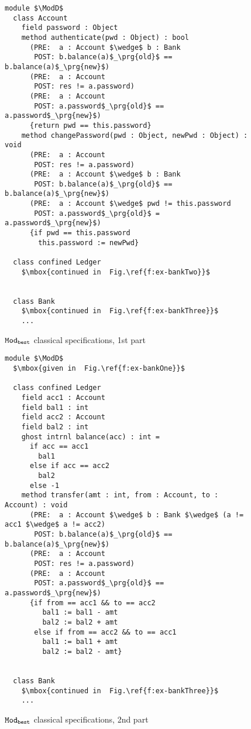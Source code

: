 \begin{figure}[htb]
\begin{lstlisting}[mathescape=true, frame=lines]
module $\ModD$
  class Account
    field password : Object
    method authenticate(pwd : Object) : bool
      (PRE:  a : Account $\wedge$ b : Bank
       POST: b.balance(a)$_\prg{old}$ == b.balance(a)$_\prg{new}$)
      (PRE:  a : Account
       POST: res != a.password)
      (PRE:  a : Account
       POST: a.password$_\prg{old}$ == a.password$_\prg{new}$)
      {return pwd == this.password}
    method changePassword(pwd : Object, newPwd : Object) : void
      (PRE:  a : Account
       POST: res != a.password)
      (PRE:  a : Account $\wedge$ b : Bank
       POST: b.balance(a)$_\prg{old}$ == b.balance(a)$_\prg{new}$)
      (PRE:  a : Account $\wedge$ pwd != this.password
       POST: a.password$_\prg{old}$ = a.password$_\prg{new}$)
      {if pwd == this.password
        this.password := newPwd}

  class confined Ledger
    $\mbox{continued in  Fig.\ref{f:ex-bankTwo}}$
      

  class Bank
    $\mbox{continued in  Fig.\ref{f:ex-bankThree}}$
    ...
\end{lstlisting}
\caption{${\texttt{Mod}}_{{\texttt{best}}}$ classical specifications, 1st part}
\label{f:ex-bankOne}
\end{figure}

\begin{figure}[htb]
\begin{lstlisting}[mathescape=true, frame=lines]
module $\ModD$
  $\mbox{given in  Fig.\ref{f:ex-bankOne}}$

  class confined Ledger
    field acc1 : Account
    field bal1 : int
    field acc2 : Account
    field bal2 : int
    ghost intrnl balance(acc) : int = 
      if acc == acc1
        bal1
      else if acc == acc2
        bal2
      else -1
    method transfer(amt : int, from : Account, to : Account) : void
      (PRE:  a : Account $\wedge$ b : Bank $\wedge$ (a != acc1 $\wedge$ a != acc2)
       POST: b.balance(a)$_\prg{old}$ == b.balance(a)$_\prg{new}$)
      (PRE:  a : Account
       POST: res != a.password)
      (PRE:  a : Account
       POST: a.password$_\prg{old}$ == a.password$_\prg{new}$)
      {if from == acc1 && to == acc2
         bal1 := bal1 - amt
         bal2 := bal2 + amt
       else if from == acc2 && to == acc1
         bal1 := bal1 + amt
         bal2 := bal2 - amt}
      

  class Bank
    $\mbox{continued in  Fig.\ref{f:ex-bankThree}}$
    ...
\end{lstlisting}
\caption{${\texttt{Mod}}_{{\texttt{best}}}$ classical specifications, 2nd part}
\label{f:ex-bankTwo}
\end{figure}

